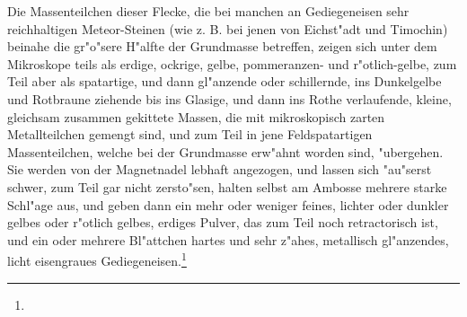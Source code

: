 \documentclass[a4paper, 11pt, oneside, german]{article}
\begin{document}
Die Massenteilchen dieser Flecke, die bei manchen an Gediegeneisen sehr reichhaltigen Meteor-Steinen (wie z. B. bei jenen von Eichst"adt und Timochin) beinahe die gr"o"sere H"alfte der Grundmasse betreffen, zeigen sich unter dem Mikroskope teils als erdige, ockrige, gelbe, pommeranzen- und r"otlich-gelbe, zum Teil aber als spatartige, und dann gl"anzende oder schillernde, ins Dunkelgelbe und Rotbraune ziehende bis ins Glasige, und dann ins Rothe verlaufende, kleine, gleichsam zusammen gekittete Massen, die mit mikroskopisch zarten Metallteilchen gemengt sind, und zum Teil in jene Feldspatartigen Massenteilchen, welche bei der Grundmasse erw"ahnt worden sind, "ubergehen. Sie werden von der Magnetnadel lebhaft angezogen, und lassen sich "au"serst schwer, zum Teil gar nicht zersto"sen, halten selbst am Ambosse mehrere starke Schl"age aus, und geben dann ein mehr oder weniger feines, lichter oder dunkler gelbes oder r"otlich gelbes, erdiges Pulver, das zum Teil noch retractorisch ist, und ein oder mehrere Bl"attchen hartes und sehr z"ahes, metallisch gl"anzendes, licht eisengraues Gediegeneisen.\footnote{}
\end{document}
